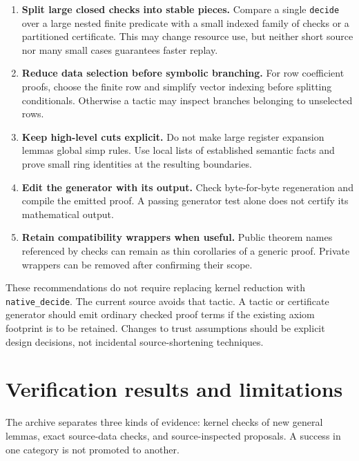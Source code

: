 \documentclass[11pt,letterpaper]{article}
\newcommand{\code}[1]{\nolinkurl{#1}}
\begin{document}
\begin{enumerate}
\item \textbf{Split large closed checks into stable pieces.} Compare a single
\code{decide} over a large nested finite predicate with a small indexed family
of checks or a partitioned certificate. This may change resource use, but
neither short source nor many small cases guarantees faster replay.
\item \textbf{Reduce data selection before symbolic branching.} For row
coefficient proofs, choose the finite row and simplify vector indexing before
splitting conditionals. Otherwise a tactic may inspect branches belonging to
unselected rows.
\item \textbf{Keep high-level cuts explicit.} Do not make large register
expansion lemmas global simp rules. Use local lists of established semantic
facts and prove small ring identities at the resulting boundaries.
\item \textbf{Edit the generator with its output.} Check byte-for-byte
regeneration and compile the emitted proof. A passing generator test alone
does not certify its mathematical output.
\item \textbf{Retain compatibility wrappers when useful.} Public theorem
names referenced by checks can remain as thin corollaries of a generic proof.
Private wrappers can be removed after confirming their scope.
\end{enumerate}

These recommendations do not require replacing kernel reduction with
\code{native_decide}. The current source avoids that tactic. A tactic or
certificate generator should emit ordinary checked proof terms if the existing
axiom footprint is to be retained. Changes to trust assumptions should be
explicit design decisions, not incidental source-shortening techniques.

\section{Verification results and limitations}
\label{sec:validation}

The archive separates three kinds of evidence: kernel checks of new general
lemmas, exact source-data checks, and source-inspected proposals. A success in
one category is not promoted to another.
\end{document}
